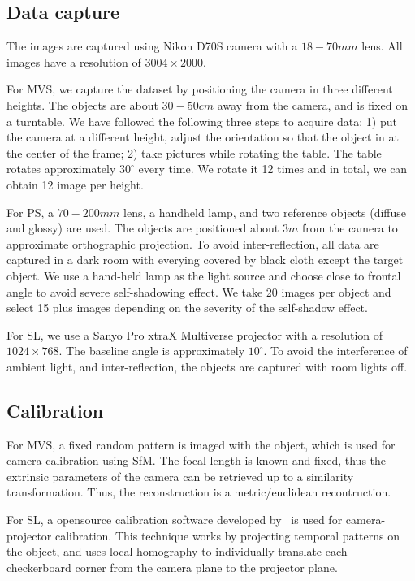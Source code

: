 \subsection{Data capture}
The images are captured using Nikon D70S camera with a $18-70mm$ lens. All images have a resolution of $3004\times 2000$. 

For MVS, we capture the dataset by positioning the camera in three different heights. The objects are about $30-50cm$ away from the camera, and is fixed on a turntable. We have followed the following three steps to acquire data: 1) put the camera at a different height, adjust the orientation so that the object in at the center of the frame; 2) take pictures while rotating the table. The table rotates approximately $30^\circ$ every time. We rotate it 12 times and in total, we can obtain 12 image per height.

For PS, a $70-200mm$ lens, a handheld lamp, and two reference objects (diffuse and glossy) are used. The objects are positioned about $3m$ from the camera to approximate orthographic projection. To avoid inter-reflection, all data are captured in a dark room with everying covered by black cloth except the target object. We use a hand-held lamp as the light source and choose close to frontal angle to avoid severe self-shadowing effect. We take 20 images per object and select 15 plus images depending on the severity of the self-shadow effect.

For SL, we use a Sanyo Pro xtraX Multiverse projector with a resolution of $1024\times 768$. The baseline angle is approximately $10^\circ$. To avoid the interference of ambient light, and inter-reflection, the objects are captured with room lights off.

\subsection{Calibration}
For MVS, a fixed random pattern is imaged with the object, which is used for camera calibration using SfM. The focal length is known and fixed, thus the extrinsic parameters of the camera can be retrieved up to a similarity transformation. Thus, the reconstruction is a metric/euclidean recontruction.

For SL, a opensource calibration software developed by~\citeauthor{moreno2012simple} is used for camera-projector calibration. This technique works by projecting temporal patterns on the object, and uses local homography to individually translate each checkerboard corner from the camera plane to the projector plane.

